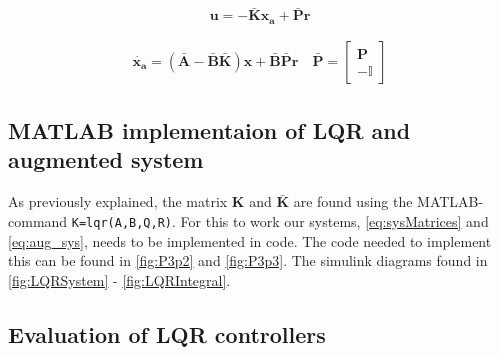 \begin{equation}\label{eq:input_aug}
    \mathbf{u} = -\mathbf{\bar{K}x_a} + \mathbf{\bar{P}r}
\end{equation}

\begin{equation}\label{eq:aug_sys_CL}
    \begin{aligned}
        \mathbf{\dot{x_a}} = \mathbf{(\bar{A}-\bar{B}\bar{K})x + \bar{B}\bar{P}r}
        \quad
        \mathbf{\bar{P}} = 
        \begin{bmatrix}
            \mathbf{P} \\ -\mathbb{I}
        \end{bmatrix}
    \end{aligned}
\end{equation}

\subsection{MATLAB implementaion of LQR and augmented system}
As previously explained, the matrix $\mathbf{K}$ and $\mathbf{\bar{K}}$ are found using the MATLAB-command \texttt{K=lqr(A,B,Q,R)}. For this to work our systems, \cref{eq:sysMatrices} and \cref{eq:aug_sys}, needs to be implemented in code.
The code needed to implement this can be found in \cref{fig:P3p2} and \cref{fig:P3p3}. The simulink diagrams found in \cref{fig:LQRSystem} - \ref{fig:LQRIntegral}.


\subsection{Evaluation of LQR controllers}

